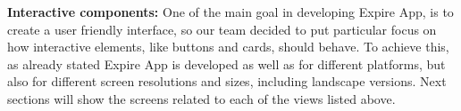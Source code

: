 \textbf{Interactive components: } One of the main goal in developing Expire App, is to create a user friendly interface, so our team decided to put particular focus on how interactive elements, like buttons and cards, should behave. To achieve this, as already stated Expire App is developed as well as for different platforms, but also for different screen resolutions and sizes, including landscape versions. Next sections will show the screens related to each of the views listed above.






